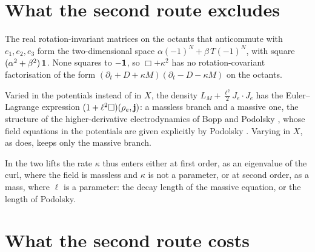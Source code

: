 \section{What the second route excludes}

\begin{proposition}
\label{prop:nofirst}
The real rotation-invariant matrices on the octants that anticommute with $e_1,e_2,e_3$ form the two-dimensional space
$\alpha(-1)^N+\beta\,T(-1)^N$, with square $(\alpha^2+\beta^2)\,\mathbf 1$. None squares to $-\mathbf 1$, so $\Box+\kappa^2$ has no rotation-covariant
factorisation of the form $(\partial_t+D+\kappa M)(\partial_t-D-\kappa M)$ on the octants.
\end{proposition}

\begin{proposition}
\label{prop:BP}
Varied in the potentials instead of in $X$, the density $L_M+\tfrac{\ell^2}2J_e\!\cdot\!J_e$ has the Euler--Lagrange expression
$(1+\ell^2\Box)(\rho_e,\mathbf j)$: a massless branch and a massive one, the structure of the higher-derivative electrodynamics of Bopp and
Podolsky \cite{Bopp40,Podolsky42}, whose field equations in the potentials are given explicitly by Podolsky \cite{Podolsky42}. Varying in $X$,
as  does, keeps only the massive branch.
\end{proposition}

In the two lifts the rate $\kappa$ thus enters either at first order, as an eigenvalue of the curl, where the field is massless and
$\kappa$ is not a parameter, or at second order, as a mass, where $\ell$ is a parameter: the decay length of the massive equation, or the
length of Podolsky.

\section{What the second route costs}

